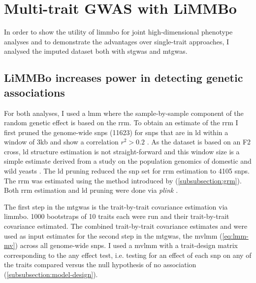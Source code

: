 \newpage
\section{Multi-trait GWAS with LiMMBo}
In order to show the utility of \gls{limmbo} for joint high-dimensional phenotype analyses and to demonstrate the advantages over single-trait approaches, I analysed the imputed dataset both with \gls{stgwas} and \gls{mtgwas}. 

\subsection{LiMMBo increases power in detecting genetic associations}
\label{subsection:power-yeast}
For both analyses, I used a \gls{lmm} where the sample-by-sample component of the random genetic effect is based on the \gls{rrm}. To obtain an estimate of the \gls{rrm} I first pruned the genome-wide \glspl{snp} (\num{11623}) for \glspl{snp} that are in \gls{ld} within a window of 3kb and show a correlation \(r^2 > 0.2\) . As the dataset is based on an F2 cross, \gls{ld} structure estimation is not straight-forward and this window size is a simple estimate derived from a study on the population genomics of domestic and wild yeasts \citep{Liti2009}. The \gls{ld} pruning reduced the \gls{snp} set for \gls{rrm} estimation to \num{4105} \glspl{snp}. The \gls{rrm} was estimated using the method introduced by \citet{Yang2011} (\cref{subsubsection:grm}). Both \gls{rrm} estimation and \gls{ld} pruning were done via \textit{plink} \citep{Chang2015}.

The first step in the \gls{mtgwas} is the trait-by-trait covariance estimation via \gls{limmbo}. \num{1000} bootstraps of \num{10} traits each were run and their trait-by-trait covariance estimated. The combined trait-by-trait covariance estimates  and  were used as input estimates for the second step in the \gls{mtgwas}, the \gls{mvlmm} (\cref{eq:lmm-mv}) across all genome-wide \glspl{snp}. I used a \gls{mvlmm} with a trait-design matrix corresponding to the any effect test, i.e. testing for an effect of each \gls{snp} on any of the traits compared versus the null hypothesis of no association (\cref{subsubsection:model-design}).

